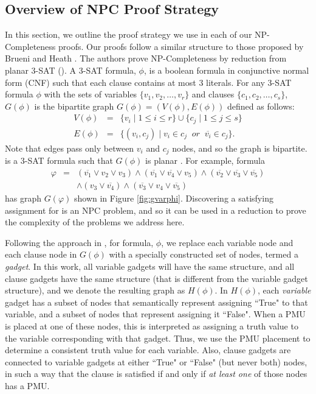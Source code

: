 \subsection{Overview of NPC Proof Strategy}
\label{subsec:proofstrat}
In this section, we outline the proof strategy we use in each of our NP-Completeness proofs. 
Our proofs follow a similar structure to those proposed by Brueni and Heath \cite{Brueni05}. The authors prove NP-Completeness by reduction from planar 3-SAT (\sats).
A 3-SAT formula, $\phi$, is a boolean formula in conjunctive normal form (CNF) such 
that each clause contains at most $3$ literals. For any 3-SAT formula $\phi$ with the sets of variables $\{v_1,v_2, \dots , v_r\}$ and clauses $\{c_1,c_2, \dots , c_s \}$, $G(\phi)$ 
is the bipartite graph $G(\phi)=(V(\phi),E(\phi))$ defined as follows:
\begin{eqnarray*}
 V(\phi) &= &\{v_i\; \vert\; 1 \leq i \leq r \} \cup \{c_j \;\vert\; 1 \leq j \leq s \} \\
 E(\phi) &=& \{ (v_i,c_j)\;\vert\; v_i \in c_j\;\; or \;\; \overline{v_i} \in c_j\}.
\end{eqnarray*}
Note that edges pass only between $v_i$ and $c_j$ nodes, and so the graph is bipartite.  \sat is a 3-SAT formula such that $G(\phi)$ is planar \cite{Lich82}. 
For example, \sat formula
\begin{eqnarray}
\varphi  &=& (\overline{v_1} \vee v_2 \vee v_3) \wedge (\overline{v_1} \vee \overline{v_4} \vee v_5) \wedge (\overline{v_2} \vee \overline{v_3} \vee \overline{v_5}) \nonumber\\
		 & & \wedge (v_3 \vee \overline{v_4}) \wedge  (\overline{v_3} \vee v_4 \vee \overline{v_5})
\label{eqn:varphi}
\end{eqnarray}
has graph $G(\varphi)$ shown in Figure \ref{fig:gvarphi}. 
Discovering a satisfying assignment for  \sat is an NPC problem, and so it can be used in a reduction to prove the complexity of the problems we address here. 

Following the approach in \cite{Brueni05}, for \sat formula, $\phi$, we replace each variable node and each clause node in $G(\phi)$ with a specially constructed set of nodes,
termed a {\em gadget}. In this work, all variable gadgets will have the same structure, and all clause gadgets have the same structure (that is different from the variable gadget structure), 
and we denote the resulting graph as $H(\phi)$. In $H(\phi)$, each {\em variable} gadget has a subset of nodes that semantically represent assigning ``True" to that variable, and a subset of 
nodes that represent assigning it ``False". When a PMU is placed at one of these nodes, this is interpreted as assigning a truth value to the \sat variable corresponding with that gadget. 
Thus, we use the PMU placement to determine a consistent truth value for each \sat variable. Also, clause gadgets are connected to variable gadgets at either ``True" or ``False" (but never both) 
nodes, in such a way that the clause is satisfied if and only if {\em at least one} of those nodes has a PMU.

